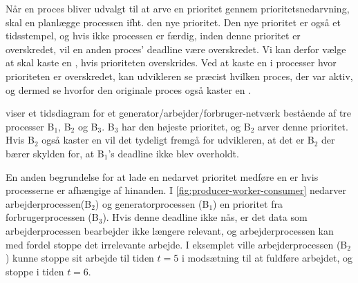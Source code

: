 Når en proces bliver udvalgt til at arve en prioritet gennem prioritetsnedarvning, skal \sched en  planlægge processen ifht. den nye prioritet.
Den nye prioritet er også et tidsstempel, og hvis ikke processen er færdig, inden denne prioritet er overskredet, vil en anden proces' deadline være overskredet. 
Vi kan derfor vælge at  skal kaste en  ,  hvis  prioriteten overskrides. Ved at kaste en  i processer hvor prioriteten er overskredet, kan udvikleren se præcist hvilken proces, der var aktiv, og dermed se hvorfor den originale proces også kaster en . 

 viser et tidsdiagram for et generator/arbejder/forbruger-netværk bestående af tre processer B$_1$, B$_2$ og B$_3$. B$_3$ har den højeste prioritet, og B$_2$ arver denne prioritet. Hvis B$_2$ også kaster en  vil det tydeligt fremgå for udvikleren, at det er B$_2$ der bærer skylden for, at B$_1$'s deadline ikke blev overholdt.

En anden begrundelse for at lade en nedarvet prioritet medføre en  er hvis processerne er afhængige af hinanden. I \cref{fig:producer-worker-consumer}  nedarver  arbejderprocessen(B$_2$) og generatorprocessen (B$_1$) en  prioritet fra forbrugerprocessen (B$_3$). Hvis denne deadline ikke nås, er det data som arbejderprocessen bearbejder ikke længere relevant, og arbejderprocessen kan med fordel stoppe det irrelevante arbejde. I eksemplet ville arbejderprocessen (B$_2$) kunne stoppe sit arbejde til tiden $t = 5$ i modsætning til at fuldføre arbejdet, og stoppe i tiden $t = 6$.

